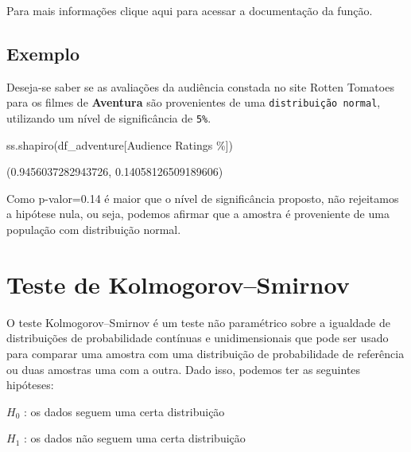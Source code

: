 \documentclass[
  letterpaper,
  DIV=11,
  numbers=noendperiod]{scrreprt}
\newenvironment{Shaded}{\begin{snugshade}}{\end{snugshade}}
\newcommand{\NormalTok}[1]{\textcolor[rgb]{0.00,0.23,0.31}{#1}}
\newcommand{\StringTok}[1]{\textcolor[rgb]{0.13,0.47,0.30}{#1}}
\begin{document}
Para mais informações clique aqui para acessar a documentação da função.

\hypertarget{exemplo-6}{%
\section{Exemplo}\label{exemplo-6}}

Deseja-se saber se as avaliações da audiência constada no site Rotten
Tomatoes para os filmes de \textbf{Aventura} são provenientes de uma
\texttt{distribuição\ normal}, utilizando um nível de significância de
\texttt{5\%}.

\begin{Shaded}
\begin{Highlighting}[]
\NormalTok{ss.shapiro(df\_adventure[}\StringTok{\textquotesingle{}Audience Ratings \%\textquotesingle{}}\NormalTok{])}
\end{Highlighting}
\end{Shaded}

\begin{tcolorbox}[enhanced jigsaw, breakable, leftrule=.75mm, left=2mm, opacityback=0, bottomrule=.15mm, toprule=.15mm, rightrule=.15mm, arc=.35mm, colback=white]

(0.9456037282943726, 0.14058126509189606)

\end{tcolorbox}

Como p-valor=0.14 é maior que o nível de significância proposto, não
rejeitamos a hipótese nula, ou seja, podemos afirmar que a amostra é
proveniente de uma população com distribuição normal.


\hypertarget{teste-de-kolmogorovsmirnov}{%
\chapter{Teste de
Kolmogorov--Smirnov}\label{teste-de-kolmogorovsmirnov}}

O teste Kolmogorov--Smirnov é um teste não paramétrico sobre a igualdade
de distribuições de probabilidade contínuas e unidimensionais que pode
ser usado para comparar uma amostra com uma distribuição de
probabilidade de referência ou duas amostras uma com a outra. Dado isso,
podemos ter as seguintes hipóteses:

\(H_{0}\) : os dados seguem uma certa distribuição

\(H_{1}\) : os dados não seguem uma certa distribuição
\end{document}
